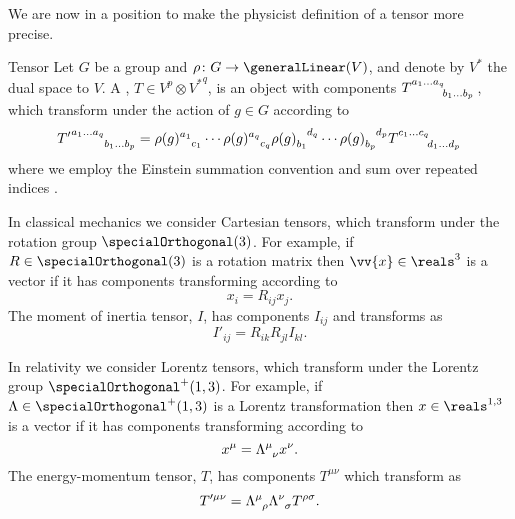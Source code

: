 \documentclass[fleqn]{NotesClass}
\newcommand{\dual}[1]{{#1^{*}}}
\newcommand{\lorentzGroup}{\specialOrthogonal^+(1, 3)}
\newcommand{\minkowskiSpace}{\reals^{1,3}}
\begin{document}
    We are now in a position to make the physicist definition of a tensor more  precise.
    \begin{dfn}{Tensor}{}
        Let \(G\) be a group and \(\rho \colon G \to \generalLinear(V)\),
        and denote by \(\dual{V}\) the dual space to \(V\).
        A , \(T \in V^p \otimes \dual{V}^q \), is an object with components \(\tensor{T}{^{a_1\dotso a_q}_{b_1 \dotso b_p}}\), which transform under the action of \(g \in G\) according to
        \begin{equation*}
            \tensor{{T'}}{^{a_1\dotso a_q}_{b_1 \dotso b_p}} = \tensor{\rho(g)}{^{a_1}_{c_1}} \dotsm \tensor{\rho(g)}{^{a_q}_{c_q}} \tensor{\rho(g)}{_{b_1}^{d_q}} \dotsm \tensor{\rho(g)}{_{b_p}^{d_p}} \tensor{T}{^{c_1\dotso c_q}_{d_1 \dotso d_p}}
        \end{equation*}
        where we employ the Einstein summation convention and sum over repeated indices \cite[18]{cvitanovic}.
    \end{dfn}
    \begin{exm}{}{}
        In classical mechanics we consider Cartesian tensors, which transform under the rotation group \(\specialOrthogonal(3)\).
        For example, if \(R \in \specialOrthogonal(3)\) is a rotation matrix then \(\vv{x} \in \reals^3\) is a vector if it has components transforming according to
        \begin{equation}
            x_i = R_{ij}x_j.
        \end{equation}
        The moment of inertia tensor, \(I\), has components \(I_{ij}\) and transforms as
        \begin{equation}
            I'_{ij} = R_{ik}R_{jl}I_{kl}.
        \end{equation}
        
        In relativity we consider Lorentz tensors, which transform under the Lorentz group \(\lorentzGroup\).
        For example, if \(\Lambda \in \lorentzGroup\) is a Lorentz transformation then \(x \in \minkowskiSpace\) is a vector if it has components transforming according to
        \begin{equation}
            x^\mu = \tensor{\Lambda}{^\mu_\nu}x^\nu.
        \end{equation}
        The energy-momentum tensor, \(T\), has components \(T^{\mu\nu}\) which transform as
        \begin{equation}
            T'^{\mu\nu} = \tensor{\Lambda}{^\mu_\rho}\tensor{\Lambda}{^\nu_\sigma} T^{\rho\sigma}.
        \end{equation}
    \end{exm}
    
\end{document}
